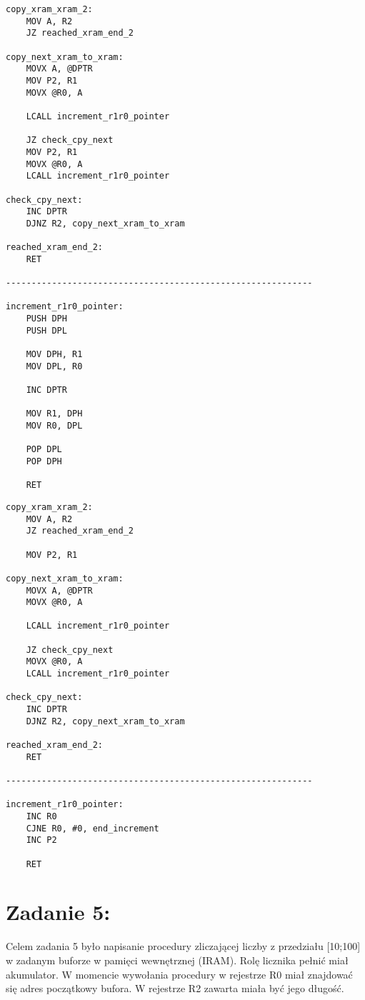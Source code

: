 \documentclass[a4paper,12pt]{article}
\begin{document}
\newpage
\begin{lstlisting}[frame=single, basicstyle=\small, caption={Kod z zadania 4 - inkrementujemy DPTR}, label={lst.zad4.1}]
copy_xram_xram_2:
	MOV A, R2
	JZ reached_xram_end_2

copy_next_xram_to_xram:
	MOVX A, @DPTR
	MOV P2, R1
	MOVX @R0, A
	
	LCALL increment_r1r0_pointer
	
	JZ check_cpy_next
	MOV P2, R1
	MOVX @R0, A
	LCALL increment_r1r0_pointer

check_cpy_next:
	INC DPTR
	DJNZ R2, copy_next_xram_to_xram

reached_xram_end_2:
	RET

------------------------------------------------------------

increment_r1r0_pointer:	
	PUSH DPH
	PUSH DPL
	
	MOV DPH, R1
	MOV DPL, R0
	
	INC DPTR
	
	MOV R1, DPH
	MOV R0, DPL
	
	POP DPL
	POP DPH
	
	RET
\end{lstlisting}
\vspace{5mm}

\begin{lstlisting}[frame=single, basicstyle=\small, caption={Kod z zadania 4 - tylko inkrementujemy parę P2$\vert$R0}, label={lst.zad4.2}]
copy_xram_xram_2:
	MOV A, R2
	JZ reached_xram_end_2
	
	MOV P2, R1
	
copy_next_xram_to_xram:
	MOVX A, @DPTR
	MOVX @R0, A
	
	LCALL increment_r1r0_pointer
	
	JZ check_cpy_next
	MOVX @R0, A
	LCALL increment_r1r0_pointer
	
check_cpy_next:
	INC DPTR
	DJNZ R2, copy_next_xram_to_xram
	
reached_xram_end_2:
	RET
	
------------------------------------------------------------
	
increment_r1r0_pointer:	
	INC R0
	CJNE R0, #0, end_increment
	INC P2
	
	RET
\end{lstlisting}
\vspace{5mm}

\section{Zadanie 5:}
Celem zadania 5 było napisanie procedury zliczającej liczby z przedziału [10;100] w zadanym buforze w pamięci wewnętrznej (IRAM). Rolę licznika pełnić miał akumulator. W momencie wywołania procedury w rejestrze R0 miał znajdować się adres początkowy bufora. W rejestrze R2 zawarta miała być jego długość.\\
\end{document}
